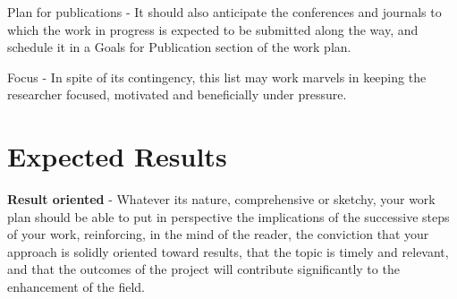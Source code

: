 \begin{tcolorbox}
Plan for publications - It should also anticipate the conferences and journals to which the work in progress is expected to be submitted along the way, and schedule it in a Goals for Publication section of the work plan.

Focus - In spite of its contingency, this list may work marvels in keeping the researcher focused, motivated and beneficially under pressure.

\section{Expected Results}

\textbf{Result oriented} - Whatever its nature, comprehensive or sketchy, your work plan should be able to put in perspective the implications of the successive steps of your work, reinforcing, in the mind of the reader, the conviction that your approach is solidly oriented toward results, that the topic is timely and relevant, and that the outcomes of the project will contribute significantly to the enhancement of the field.

	
	
\end{tcolorbox}

